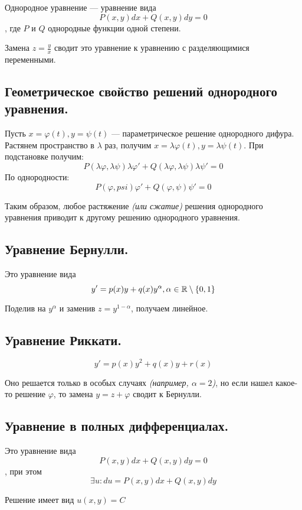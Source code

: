 Однородное уравнение --- уравнение вида
\[P(x, y)dx + Q(x, y)dy = 0\]
, где \(P\) и \(Q\) однородные функции одной степени.

Замена \(z = \frac{y}{x}\) сводит это уравнение к уравнению с разделяющимися переменными.

\subsection*{Геометрическое свойство решений однородного уравнения.}

Пусть \(x = \varphi(t), y = \psi(t)\) --- параметрическое решение однородного дифура. Растянем пространство в \(\lambda\) раз, получим \(x = \lambda \varphi(t), y = \lambda \psi(t)\). При подстановке получим:
\[P(\lambda\varphi, \lambda\psi) \lambda\varphi' + Q(\lambda\varphi, \lambda\psi)\lambda\psi' = 0\]
По однородности:
\[P(\varphi, psi) \varphi' + Q(\varphi, \psi)\psi' = 0\]

Таким образом, любое растяжение \textit{(или сжатие)} решения однородного уравнения приводит к другому решению однородного уравнения.

\subsection*{Уравнение Бернулли.}

Это уравнение вида
\[y' = p(x) y + q(x) y^\alpha, \alpha\in\mathbb{R}\setminus \{0,1\}\]

Поделив на \(y^\alpha\) и заменив \(z = y^{1 - \alpha}\), получаем линейное.

\subsection*{Уравнение Риккати.}

\[y' = p(x) y^2 + q(x)y + r(x)\]

Оно решается только в особых случаях \textit{(например, \(\alpha = 2\))}, но если нашел какое-то решение \(\varphi\), то замена \(y = z + \varphi\) сводит к Бернулли.

\subsection*{Уравнение в полных дифференциалах.}

Это уравнение вида
\[P(x, y) dx + Q(x, y)dy = 0\]
, при этом
\[\exists u : du = P(x, y) dx + Q(x, y) dy\]

Решение имеет вид \(u(x, y) = C\)

